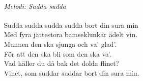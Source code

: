 \\
{\footnotesize\textit{Melodi: Sudda sudda}}\\
\\
Sudda sudda sudda sudda bort din sura min\\
Med fyra jättestora bamseklunkar ädelt vin.\\
Munnen den ska sjunga och va' glad'.\\
För att den ska bli som den ska va'.\\
Vad häller du då bak det dolda flinet?\\
Vinet, som suddar suddar bort din sura min.
